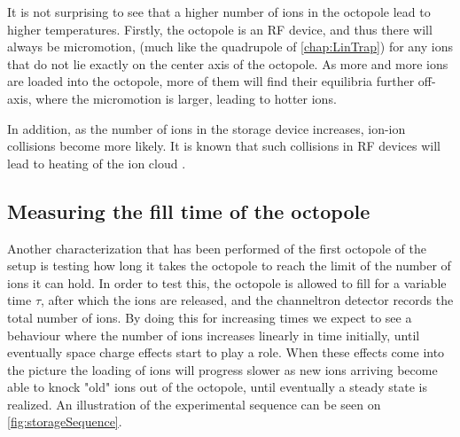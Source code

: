 It is not surprising to see that a higher number of ions in the octopole lead to higher temperatures. Firstly, the octopole is an RF device, and thus there will always be micromotion,
 (much like the quadrupole of \cref{chap:LinTrap}) for any ions that do not lie exactly on the center axis of the octopole. 
As more and more ions are loaded into the octopole, more of them will find their equilibria further off-axis, where the micromotion is larger, leading to hotter ions.

In addition, as the number of ions in the storage device increases, ion-ion collisions become more likely. It is known that such collisions in RF devices will lead to heating of the ion cloud \cite{BlumelHeating,MichaelIonIonHeating}.


\subsection{Measuring the fill time of the octopole}
Another characterization that has been performed of the first octopole of the setup is testing how long it takes the octopole to reach the limit of the number of ions it can hold.
In order to test this, the octopole is allowed to fill for a variable time $\tau$, after which the ions are released, and the channeltron detector records the total number of ions.
By doing this for increasing times we expect to see a behaviour where the number of ions increases linearly in time initially, until eventually space charge effects start to play a role.
When these effects come into the picture the loading of ions will progress slower as new ions arriving become able to knock "old" ions out of the octopole, until eventually a steady state is realized.
An illustration of the experimental sequence can be seen on \cref{fig:storageSequence}. 

